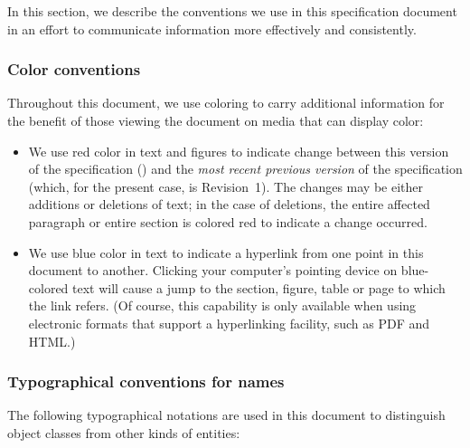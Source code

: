 \begin{blockChanged}

In this section, we describe the conventions we use in this
specification document in an effort to communicate information
more effectively and consistently.


\subsubsection{Color conventions}
\label{sec:notation-color}

Throughout this document, we use coloring to carry additional
information for the benefit of those viewing the document on media
that can display color:

\begin{itemize}

\item We use red color in text and figures to indicate change
  between this version of the specification (\thisLVR) and the
  \emph{most recent previous version} of the specification (which,
  for the present case, is \sbmltwotwo Revision~1).  The changes
  may be either additions or deletions of text; in the case of
  deletions, the entire affected paragraph or entire section is
  colored red to indicate a change occurred.

\item We use blue color in text to indicate a hyperlink from one
  point in this document to another.  Clicking your computer's
  pointing device on blue-colored text will cause a jump to the
  section, figure, table or page to which the link refers.  (Of
  course, this capability is only available when using electronic
  formats that support a hyperlinking facility, such as PDF and
  HTML.)

\end{itemize}

\end{blockChanged}

\subsubsection{Typographical conventions for names}
\label{sec:notation-typographical}

The following typographical notations are used in this document to
distinguish object classes from other kinds of entities:

